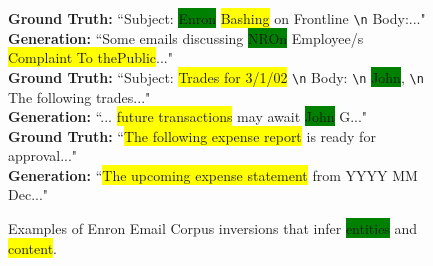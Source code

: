 \begin{figure}[t]
  \centering
    \begin{callout}
    \textbf{Ground Truth:} ``Subject: \colorbox{green}{Enron} \colorbox{yellow}{Bashing} on Frontline \verb|\n| Body:..."\\
    \textbf{Generation:} ``Some emails discussing \colorbox{green}{NROn} Employee/s \colorbox{yellow}{Complaint To thePublic}..."\\
    
    \textbf{Ground Truth:} ``Subject: \colorbox{yellow}{Trades for 3/1/02} \verb|\n| Body: \verb|\n| \colorbox{green}{John}, \verb|\n| The following trades..."\\
    \textbf{Generation:} ``... \colorbox{yellow}{future transactions} may await \colorbox{green}{John} G..."\\

    \textbf{Ground Truth:} ``\colorbox{yellow}{The following expense report} is ready for approval..."\\
    \textbf{Generation:} ``\colorbox{yellow}{The upcoming expense statement} from YYYY MM Dec..."    
    \end{callout}
  \caption{Examples of Enron Email Corpus inversions that infer \colorbox{green}{entities} and \colorbox{yellow}{content}.}
  \label{fig:inversion_example}
\end{figure}











